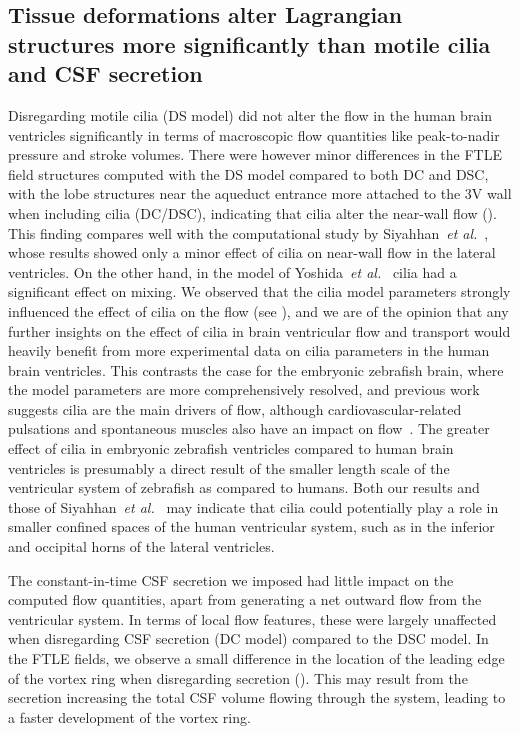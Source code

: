 \documentclass{template}
\begin{document}
\subsection{Tissue deformations alter Lagrangian structures more significantly
than motile cilia and CSF secretion}
Disregarding motile cilia (DS model) did not alter the flow in the human brain ventricles significantly
in terms of macroscopic flow quantities like peak-to-nadir pressure and stroke volumes. 
There were however minor differences in the FTLE field structures computed with the DS model compared
to both DC and DSC, with the lobe structures near the aqueduct
entrance more attached to the 3V wall when including cilia (DC/DSC),
indicating that cilia alter the near-wall flow ().
This finding compares well with the computational study
by Siyahhan~\emph{et al.}~\citep{Siyahhan2014FlowVentricles},
whose results showed only a minor effect of cilia on near-wall flow in the lateral
ventricles. On the other hand, in the model of Yoshida~\emph{et al.}~\citep{Yoshida2022EffectVentricles} 
cilia had a significant effect on mixing. We observed that the cilia model parameters
strongly influenced the effect of cilia on the flow (see ),
and we are of the opinion that any further insights on the effect of cilia in
brain ventricular flow and transport would heavily benefit from more experimental data
on cilia parameters in the human brain ventricles.
This contrasts the case for the embryonic zebrafish brain, where the model parameters
are more comprehensively resolved, and previous work suggests cilia are
the main drivers of flow, although cardiovascular-related pulsations and
spontaneous muscles also have an impact on flow~\citep{Olstad2019CiliaryDevelopment, Herlyng2025AdvectionDiffusion, Thouvenin2020OriginCanal}.
The greater effect of cilia in embryonic zebrafish ventricles compared to human brain ventricles is presumably a direct result of the smaller
length scale of the ventricular system of zebrafish as compared to humans. Both our results and
those of Siyahhan~\emph{et al.}~\citep{Siyahhan2014FlowVentricles} may indicate that cilia could potentially play a 
role in smaller confined spaces of the human ventricular system,
such as in the inferior and occipital horns of the lateral ventricles.

The constant-in-time CSF secretion we imposed had little impact on the
computed flow quantities, apart from generating a net outward flow from the
ventricular system. In terms of local flow features,
these were largely unaffected when disregarding CSF secretion (DC model)
compared to the DSC model. In the FTLE fields, we observe a small
difference in the location of the leading edge of the vortex ring
when disregarding secretion ().
This may result from the secretion increasing the total CSF volume
flowing through the system, leading to a faster development of the vortex ring.
\end{document}
